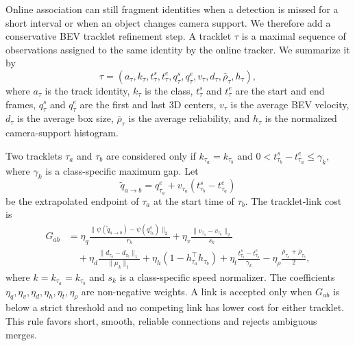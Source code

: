 \documentclass[runningheads]{llncs}
\begin{document}
Online association can still fragment identities when a detection is missed for a
short interval or when an object changes camera support. We therefore add a
conservative BEV tracklet refinement step. A tracklet $\tau$ is a maximal sequence
of observations assigned to the same identity by the online tracker. We summarize it
by
\begin{equation}
    \tau=(a_{\tau},k_{\tau},t_{\tau}^{s},t_{\tau}^{e},
    q_{\tau}^{s},q_{\tau}^{e},v_{\tau},d_{\tau},\bar{\rho}_{\tau},h_{\tau}),
    \label{eq:tracklet_state}
\end{equation}
where $a_{\tau}$ is the track identity, $k_{\tau}$ is the class,
$t_{\tau}^{s}$ and $t_{\tau}^{e}$ are the start and end frames,
$q_{\tau}^{s}$ and $q_{\tau}^{e}$ are the first and last 3D centers,
$v_{\tau}$ is the average BEV velocity, $d_{\tau}$ is the average box size,
$\bar{\rho}_{\tau}$ is the average reliability, and $h_{\tau}$ is the normalized
camera-support histogram.

Two tracklets $\tau_a$ and $\tau_b$ are considered only if
$k_{\tau_a}=k_{\tau_b}$ and $0<t_{\tau_b}^{s}-t_{\tau_a}^{e}\leq\gamma_k$, where
$\gamma_k$ is a class-specific maximum gap. Let
\begin{equation}
    \tilde{q}_{a\rightarrow b}
    =
    q_{\tau_a}^{e}
    +
    v_{\tau_a}(t_{\tau_b}^{s}-t_{\tau_a}^{e})
    \label{eq:tracklet_extrapolation}
\end{equation}
be the extrapolated endpoint of $\tau_a$ at the start time of $\tau_b$. The
tracklet-link cost is
\begin{equation}
\begin{aligned}
    G_{ab}
    &=
    \eta_q
    \frac{\|\psi(\tilde{q}_{a\rightarrow b})-\psi(q_{\tau_b}^{s})\|_2}{r_k}
    +
    \eta_v
    \frac{\|v_{\tau_a}-v_{\tau_b}\|_2}{s_k}  \\
    &\quad
    +
    \eta_d
    \frac{\|d_{\tau_a}-d_{\tau_b}\|_1}{\|\mu_k\|_1}
    +
    \eta_h
    \left(1-h_{\tau_a}^{\top}h_{\tau_b}\right)
    +
    \eta_t
    \frac{t_{\tau_b}^{s}-t_{\tau_a}^{e}}{\gamma_k}
    -
    \eta_{\rho}
    \frac{\bar{\rho}_{\tau_a}+\bar{\rho}_{\tau_b}}{2},
\end{aligned}
    \label{eq:tracklet_cost}
\end{equation}
where $k=k_{\tau_a}=k_{\tau_b}$ and $s_k$ is a class-specific speed normalizer.
The coefficients $\eta_q,\eta_v,\eta_d,\eta_h,\eta_t,\eta_{\rho}$ are
non-negative weights. A link is accepted only when $G_{ab}$ is below a strict
threshold and no competing link has lower cost for either tracklet. This rule
favors short, smooth, reliable connections and rejects ambiguous merges.
\end{document}
